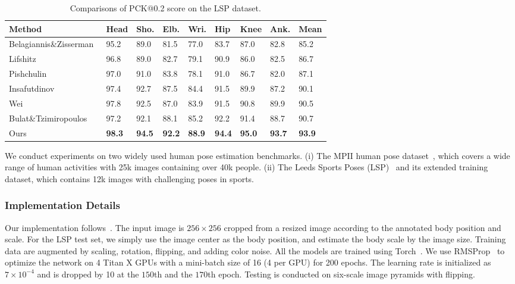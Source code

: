 \documentclass[10pt,twocolumn,letterpaper]{article}
\begin{document}
\begin{table} \begin{footnotesize}
		\centering
		\caption{   Comparisons of PCK@0.2 score on the LSP dataset.}
		\begin{tabular}{@{}p{2.7cm}p{0.3cm}p{0.3cm}p{0.3cm}p{0.3cm}p{0.3cm}p{0.3cm}p{0.3cm}p{0.4cm}}
			\hline
			Method & Head & Sho. & Elb. & Wri. & Hip & Knee & Ank. & Mean \\
			\hline 
			Belagiannis\&Zisserman~\cite{belagiannis2016recurrent} & 95.2 & 89.0 & 81.5 & 77.0 & 83.7 & 87.0 & 82.8 & 85.2 \\
			Lifshitz \etal~\cite{lifshitz2016human} & 96.8 & 89.0 & 82.7 & 79.1 & 90.9 & 86.0 & 82.5 & 86.7 \\
			Pishchulin \etal~\cite{pishchulin2016deepcut} & 97.0 & 91.0 & 83.8 & 78.1 & 91.0 & 86.7 & 82.0 & 87.1 \\
			Insafutdinov \etal~\cite{insafutdinov2016deepercut} & 97.4 & 92.7 & 87.5 & 84.4 & 91.5 & 89.9 & 87.2 & 90.1 \\
			Wei \etal~\cite{wei2016convolutional} & 97.8 & 92.5 & 87.0 & 83.9 & 91.5 & 90.8 & 89.9 & 90.5 \\
			Bulat\&Tzimiropoulos~\cite{bulat2016human} & 97.2 & 92.1 & 88.1 & 85.2 & 92.2 & 91.4 & 88.7 & 90.7 \\
\hline
			Ours & \textbf{98.3}& \textbf{94.5} & \textbf{92.2} & \textbf{88.9} & \textbf{94.4} & \textbf{95.0} & \textbf{93.7} & \textbf{93.9} \\
			\hline      
		\end{tabular}
		\label{tab:LSP}
	\end{footnotesize}
\vspace{-1em}
\end{table}
We conduct experiments on two widely used human pose estimation benchmarks.
(i) The MPII human pose dataset~\cite{andriluka20142d}, which covers a wide range of human activities with 25k images containing over 40k people. 
(ii) The Leeds Sports Poses (LSP)~\cite{Johnson10} and its extended training dataset, which contains 12k images with challenging poses in sports. 

\subsubsection{Implementation Details}
Our implementation follows~\cite{newell2016stacked}. The input image is $256\times 256$ cropped from a resized image according to the annotated body position and scale. 
For the LSP test set, we simply use the image center as the body position, and estimate the body scale by the image size. 
Training data are augmented by scaling, rotation, flipping, and adding color noise. 
All the models are trained using Torch~\cite{collobert2011torch7}. 
We use RMSProp~\cite{tieleman2012lecture} to optimize the network on 4 Titan X GPUs with a mini-batch size of 16 (4 per GPU) for 200 epochs. The learning rate is initialized as $7\times10^{-4}$ and is dropped by 10 at the $150$th and the $170$th epoch. Testing is conducted on six-scale image pyramids with flipping. 
\end{document}
